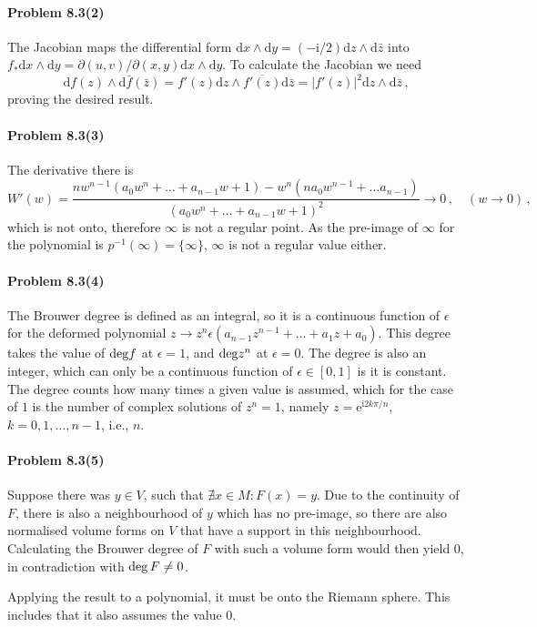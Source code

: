 \documentclass[a4paper,12pt]{article}
\def\d{\mathrm{d}}
\def\e{\mathrm{e}}
\def\imagi{\mathrm{i}}
\newcommand{\problem}[1]{\paragraph{Problem #1}}
\begin{document}

\problem{8.3(2)} The Jacobian maps the differential form $\d x\wedge \d y = (-\imagi / 2 )\d z \wedge \d \bar{z}$ into $f_* \d x\wedge \d y = \partial(u, v)/\partial(x, y) \d x\wedge \d y$. To calculate the Jacobian we need
\[
 \d f(z) \wedge \d \bar{f}(\bar z) = f'(z) \d z \wedge \overline{f'(z)} \d \bar z = |f'(z)|^2 \d z \wedge \d \bar{z}\,,
\]
proving the desired result.


\problem{8.3(3)} The derivative there is
\[
 W'(w) = \frac{n w^{n-1} (a_0 w^n + \dots + a_{n-1}w+1) - w^n (n a_0 w^{n-1} + \dots a_{n-1})}{(a_0 w^n +\dots+a_{n-1}w+1)^2}\to 0\,,\quad(w\to 0)\,,
\]
which is not onto, therefore $\infty$ is not a regular point. As the pre-image of $\infty$ for the polynomial is $p^{-1}(\infty) = \{\infty\}$, $\infty$ is not a regular value either.


\problem{8.3(4)} The Brouwer degree is defined as an integral, so it is a continuous function of $\epsilon$ for the deformed polynomial $z\to z^n \epsilon(a_{n-1}z^{n-1}+\dots + a_1 z + a_0)$. This degree takes the value of ${\rm deg}f$ at $\epsilon =1$, and ${\rm deg}z^n$ at $\epsilon=0$. The degree is also an integer, which can only be a continuous function of $\epsilon \in [0, 1]$ is it is constant. The degree counts how many times a given value is assumed, which for the case of $1$ is the number of complex solutions of $z^n = 1$, namely $z=\e^{\imagi 2 k \pi/n}$, $k=0, 1, \dots, n-1$, i.e., $n$.


\problem{8.3(5)} Suppose there was $y\in V$, such that $\nexists x\in M: F(x)=y$. Due to the continuity of $F$, there is also a neighbourhood of $y$ which has no pre-image, so there are also normalised volume forms on $V$ that have a support in this neighbourhood. Calculating the Brouwer degree of $F$ with such a volume form would then yield 0, in contradiction with $\mathop{\rm deg}F \ne 0$.

Applying the result to a polynomial, it must be onto the Riemann sphere. This includes that it also assumes the value 0.

\end{document}
